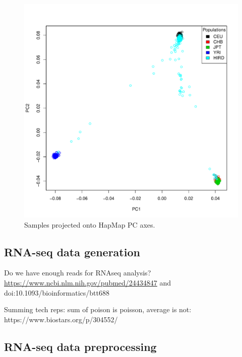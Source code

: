 \begin{figure}
    \includegraphics[width=1.0\textwidth]{./mainmatter/figures/chapter_02/coreex_eQTLflu_20171204.gencall.smajor.impute_sex.qc3.pruned.hapmap_merged.flipped.pca.evec.pdf}
    \caption{Samples projected onto HapMap PC axes.}
\end{figure}

\subsection{RNA-seq data generation}

Do we have enough reads for RNAseq analysis? \url{https://www.ncbi.nlm.nih.gov/pubmed/24434847} and doi:10.1093/bioinformatics/btt688

Summing tech reps: sum of poison is poisson, average is not: https://www.biostars.org/p/304552/

\subsection{RNA-seq data preprocessing}

